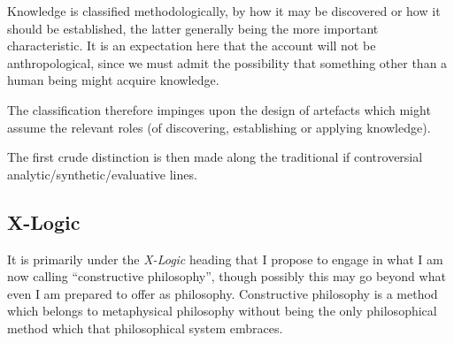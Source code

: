 \documentclass[numreferences]{rbjk}
\begin{document}
\begin{article}
Knowledge is classified methodologically, by how it may be discovered or how it should be established, the latter generally being the more important characteristic.
It is an expectation here that the account will not be anthropological, since we must admit the possibility that something other than a human being might acquire knowledge.

The classification therefore impinges upon the design of artefacts which might assume the relevant roles (of discovering, establishing or applying knowledge).

The first crude distinction is then made along the traditional if controversial analytic/synthetic/evaluative lines.

\subsection{X-Logic}

It is primarily under the {\it X-Logic} heading that I propose to engage in what I am now calling ``constructive philosophy'', though possibly this may go beyond what even I am prepared to offer as philosophy.
Constructive philosophy is a method which belongs to metaphysical philosophy without being the only philosophical method which that philosophical system embraces.



%

{\raggedright


} %


\end{article}
\end{document}
